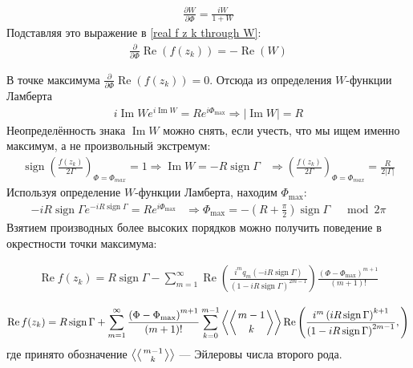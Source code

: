 \documentclass[a4paper, 12pt]{article}
\DeclareMathOperator*{\sign}{sign}
\DeclareMathOperator*{\Real}{Re}
\DeclareMathOperator*{\Imag}{Im}
\newenvironment{eqw}{\begin{equation} \begin{aligned}}   
    {\end{aligned}    \end{equation}}
\begin{document}
\begin{eqw}
    \frac{\partial W}{\partial \Phi} = \frac{iW}{1+W}
\end{eqw}
Подставляя это выражение в \eqref{real f z k through W}:
\begin{eqw}
    \frac{\partial}{\partial\Phi}\Real\left(f(z_k)\right) = -\Real(W)
\end{eqw}

В точке максимума $\frac{\partial}{\partial\Phi}\Real\left(f(z_k)\right) = 0$. Отсюда из определения $W$-функции Ламберта
\begin{eqw}
    i\Imag W e^{i\Imag W} = R e^{i\Phi_{\max}} \Rightarrow \left|\Imag W\right| = R
\end{eqw}
Неопределённость знака $\Imag W$ можно снять, если учесть, что мы ищем именно максимум, а не произвольный экстремум:
\begin{eqw}
    \sign\left(\frac{f(z_k)}{2\Gamma}\right)_{\Phi = \Phi_{max}} = 1 \Rightarrow \Imag W = - R\sign \Gamma 
    &\Rightarrow \left(\frac{f(z_k)}{2\Gamma}\right)_{\Phi = \Phi_{max}} = \frac{R}{2|\Gamma|}
\end{eqw}
Используя определение $W$-функции Ламберта, находим $\Phi_{\max}$:
\begin{eqw}
    - i R \sign \Gamma  e^{- i R \sign \Gamma } = R e^{i\Phi_{\max}} &\Rightarrow \Phi_{\max} = -\left(R+\frac{\pi}{2}\right)\sign \Gamma \;\;\; \mod 2\pi
\end{eqw}
Взятием производных более высоких порядков \cite[formula 3.5]{corless1996lambertw} можно получить поведение в окрестности точки максимума:

\begin{eqw}
    \Real f(z_k) = R\sign \Gamma - \sum\limits_{m=1}^{\infty} \Real\left(\frac{i^m q_{m}\left(-iR\sign \Gamma\right)}{\left(1-iR\sign \Gamma\right)^{2m-1}}\right)\frac{\left(\Phi - \Phi_{\max}\right)^{m+1}}{(m+1)!}
\end{eqw}

\begin{eqw}
    \Real f(z_k) = R\sign \Gamma + \sum\limits_{m=1}^{\infty} \frac{\left(\Phi - \Phi_{\max}\right)^{m+1}}{(m+1)!}
    \sum\limits_{k=0}^{m-1}\left\langle\left\langle{m-1}\atop {k}\right\rangle\right\rangle 
    \Real\left(\frac{i^{m}\left(i R\sign \Gamma\right)^{k+1} }{\left(1-iR\sign\Gamma\right)^{2m-1}},\right)
\end{eqw}
где принято обозначение $\left\langle\left\langle{m-1}\atop {k}\right\rangle\right\rangle$ --- Эйлеровы числа второго рода.
\end{document}

